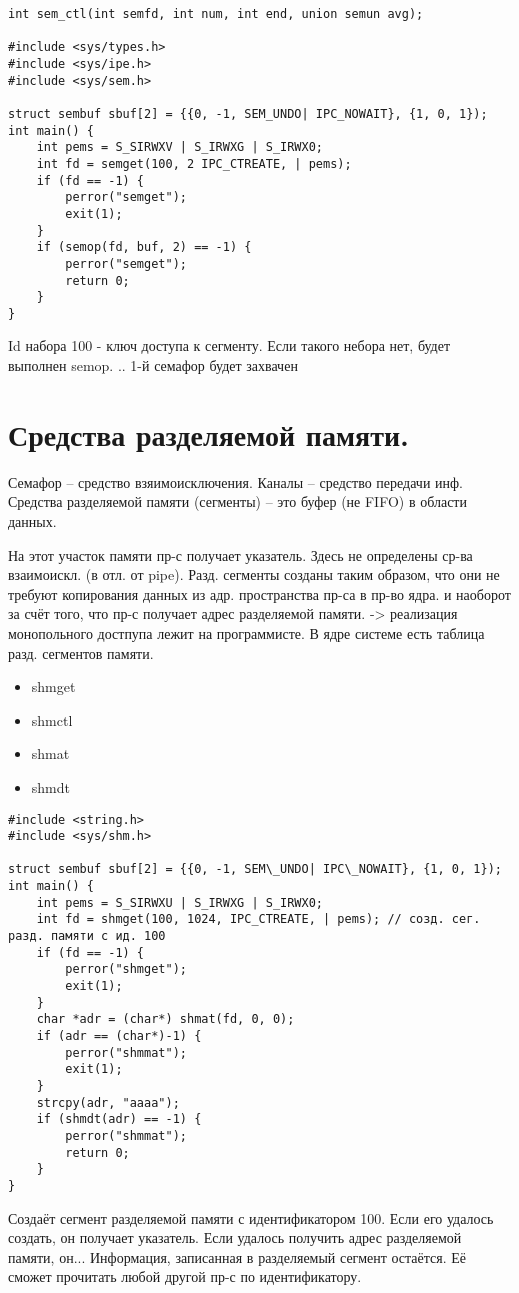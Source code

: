  \begin{lstlisting}
int sem_ctl(int semfd, int num, int end, union semun avg);

#include <sys/types.h>
#include <sys/ipe.h>
#include <sys/sem.h>

struct sembuf sbuf[2] = {{0, -1, SEM_UNDO| IPC_NOWAIT}, {1, 0, 1});
int main() {
	int pems = S_SIRWXV | S_IRWXG | S_IRWX0;
	int fd = semget(100, 2 IPC_CTREATE, | pems);
	if (fd == -1) {
		perror("semget");
		exit(1);
	}
	if (semop(fd, buf, 2) == -1) {
		perror("semget");
		return 0;
	}
}
\end{lstlisting}

Id набора 100 - ключ доступа к сегменту. Если такого небора нет, будет выполнен semop. .. 1-й семафор будет захвачен

\section{Средства разделяемой памяти.}
Семафор -- средство взяимоисключения. Каналы -- средство передачи инф.
Средства разделяемой памяти (сегменты) -- это буфер (не FIFO) в области данных. 

На этот участок памяти пр-с получает указатель. Здесь не определены ср-ва взаимоискл. (в отл. от pipe).
Разд. сегменты созданы таким образом, что они не требуют копирования данных из адр. пространства пр-са в пр-во ядра.
и наоборот за счёт того, что пр-с получает адрес разделяемой памяти. -> реализация монопольного достпупа лежит на программисте.
В ядре системе есть таблица разд. сегментов памяти. 

\begin{itemize}
	\item shmget
	\item shmctl 
	\item shmat
	\item shmdt  
\end{itemize}

\begin{lstlisting}
#include <string.h>
#include <sys/shm.h>

struct sembuf sbuf[2] = {{0, -1, SEM\_UNDO| IPC\_NOWAIT}, {1, 0, 1});
int main() {
	int pems = S_SIRWXU | S_IRWXG | S_IRWX0;
	int fd = shmget(100, 1024, IPC_CTREATE, | pems); // созд. сег. разд. памяти с ид. 100
	if (fd == -1) {
		perror("shmget");
		exit(1);
	}
	char *adr = (char*) shmat(fd, 0, 0);
	if (adr == (char*)-1) {
		perror("shmmat");
		exit(1);
	}
	strcpy(adr, "aaaa");
	if (shmdt(adr) == -1) {
		perror("shmmat");
		return 0;
	}
}
\end{lstlisting}
Создаёт сегмент разделяемой памяти с идентификатором 100. Если его удалось создать, он получает указатель. Если удалось получить адрес разделяемой памяти, он...
Информация, записанная в разделяемый сегмент остаётся. Её сможет прочитать любой другой пр-с по идентификатору.

